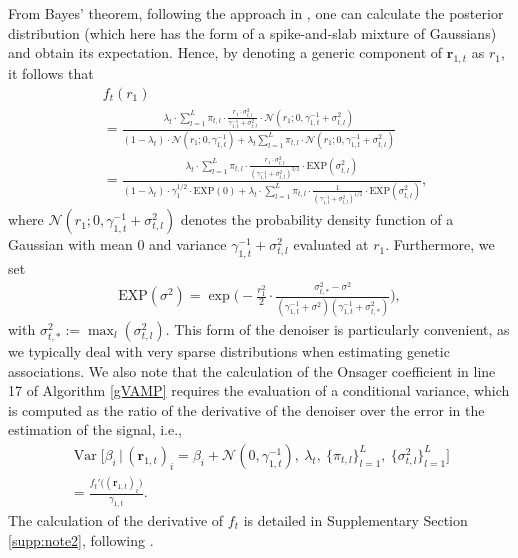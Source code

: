 From Bayes' theorem, following the approach in \cite{EMGAMP2012}, one can calculate the posterior distribution (which here has the form of a spike-and-slab mixture of Gaussians) and obtain its expectation. Hence, by denoting a generic component of $\bm{r}_{1,t}$ as $r_1$, it follows that
\begin{align}
    \label{denoiser}
    & f_t(r_1) \nonumber \\
    & = \frac{\lambda_t \cdot \sum_{l=1}^L \pi_{t,l} \cdot \frac{r_1 \cdot \sigma_{t,l}^{2}}{\gamma_{1,t}^{-1} + \sigma_{t,l}^{2}} \cdot \mathcal{N}(r_1; 0, \gamma_{1,t}^{-1} + \sigma_{t,l}^{2})}{ (1-\lambda_t) \cdot \mathcal{N}(r_1; 0, \gamma_{1,t}^{-1}) + \lambda_t \sum_{l=1}^L \pi_{t,l} \cdot \mathcal{N}(r_1; 0, \gamma_{1,t}^{-1} + \sigma_{t,l}^2) } \nonumber \\
    & = \frac{\lambda_t \cdot \sum_{l=1}^L \pi_{t,l} \cdot \frac{r_1 \cdot \sigma_{t,l}^2}{(\gamma_{1,t}^{-1} + \sigma_{t,l}^{2})^{3/2}} \cdot \text{EXP}(\sigma_{t,l}^2) }{(1-\lambda_t) \cdot \gamma_1^{1/2} \cdot \text{EXP}(0) + \lambda_t \cdot \sum_{l=1}^L \pi_{t,l} \cdot \frac{1}{(\gamma_{1,t}^{-1} + \sigma_{t,l}^2)^{1/2}} \cdot \text{EXP}(\sigma_{t,l}^2)}, 
\end{align}
where $\mathcal{N}(r_1; 0, \gamma_{1,t}^{-1} + \sigma_{t,l}^{2})$ denotes the probability density function of a Gaussian with mean $0$ and variance $\gamma_{1,t}^{-1} + \sigma_{t,l}^{2}$ evaluated at $r_1$. Furthermore, we set 
\begin{align}
    \text{EXP}(\sigma^2) = \exp \bigg ( - \frac{r_1^2}{2} \cdot \frac{\sigma_{t,*}^2 - \sigma^2}{(\gamma_{1,t}^{-1} + \sigma^2) (\gamma_{1,t}^{-1} + \sigma_{t, *}^2)} \bigg ),
\end{align} 
with $\sigma_{t,*}^2:= \max_{l}(\sigma_{t,l}^2)$. This form of the denoiser is particularly convenient, as we typically deal with very sparse distributions when estimating genetic associations. We also note that the calculation of the Onsager coefficient in line 17 of Algorithm \ref{gVAMP} requires the evaluation of a conditional variance, which is computed as the ratio of the derivative of the denoiser over the error in the estimation of the signal, i.e., 
\begin{multline}
    \label{den_onsager}
    \operatorname{Var}\Big[\beta_i \,\Big|\, (\bm{r}_{1,t})_i = \beta_i + \mathcal{N}(0, \gamma_{1,t}^{-1}),\ \lambda_t,\ \{\pi_{t,l}\}_{l=1}^L,\ \{\sigma_{t,l}^2\}_{l=1}^L\Big] \\
    = \frac{f_t'\big((\bm{r}_{1,t})_i\big)}{\gamma_{1,t}}.
\end{multline} 
The calculation of the derivative of $f_t$ is detailed in Supplementary Section \ref{supp:note2}, following \cite{EMGAMP2012}.

